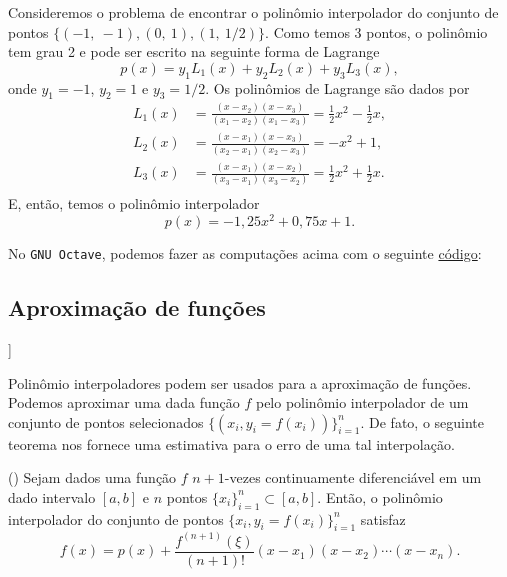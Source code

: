 \begin{ex}
  Consideremos o problema de encontrar o polinômio interpolador do conjunto de pontos $\{(-1,~-1), (0,~1), (1,~1/2)\}$. Como temos 3 pontos, o polinômio tem grau 2 e pode ser escrito na seguinte forma de Lagrange
  \begin{equation}
    p(x) = y_1L_1(x) + y_2L_2(x) + y_3L_3(x),
  \end{equation}
  onde $y_1 = -1$, $y_2 = 1$ e $y_3 = 1/2$. Os polinômios de Lagrange são dados por
  \begin{align}
    L_1(x) &= \frac{(x-x_2)(x-x_3)}{(x_1-x_2)(x_1-x_3)} = \frac{1}{2}x^2 - \frac{1}{2}x,\\
    L_2(x) &= \frac{(x-x_1)(x-x_3)}{(x_2-x_1)(x_2-x_3)} = -x^2 + 1,\\
    L_3(x) &= \frac{(x-x_1)(x-x_2)}{(x_3-x_1)(x_3-x_2)} = \frac{1}{2}x^2 + \frac{1}{2}x.\\
  \end{align}
  E, então, temos o polinômio interpolador
  \begin{equation}
    p(x) = -1,25x^2 + 0,75x + 1.
  \end{equation}

\ifisoctave
No \verb+GNU Octave+, podemos fazer as computações acima com o seguinte \href{https://github.com/phkonzen/notas/blob/master/src/MatematicaNumerica/cap_interp/dados/ex_interpoli_lagrange/ex_interpoli_lagrange.m}{código}:

\fi
\end{ex}

\subsection{Aproximação de funções}

\begin{flushleft}
  [[tag:revisar]]
\end{flushleft}

Polinômio interpoladores podem ser usados para a aproximação de funções. Podemos aproximar uma dada função $f$ pelo polinômio interpolador de um conjunto de pontos selecionados $\{(x_i, y_i=f(x_i))\}_{i=1}^n$. De fato, o seguinte teorema nos fornece uma estimativa para o erro de uma tal interpolação.

\begin{teo}()\label{teo:lagrange}
  Sejam dados uma função $f$ $n+1$-vezes continuamente diferenciável em um dado intervalo $[a, b]$ e $n$ pontos $\{x_i\}_{i=1}^n\subset [a, b]$. Então, o polinômio interpolador do conjunto de pontos $\{x_i, y_i=f(x_i)\}_{i=1}^n$ satisfaz
  \begin{equation}
    f(x) = p(x) + \frac{f^{(n+1)}(\xi)}{(n+1)!}(x-x_1)(x-x_2)\cdots (x-x_n).
  \end{equation}
\end{teo}
\begin{dem}
  \emconstrucao
\end{dem}

